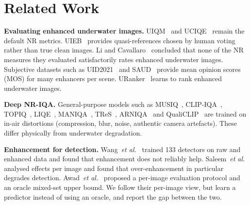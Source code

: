 \documentclass[conference]{IEEEtran}
\begin{document}
\section{Related Work}
\textbf{Evaluating enhanced underwater images.} UIQM~\cite{panetta2016uiqm} and UCIQE~\cite{yang2015uciqe} remain the default NR metrics. UIEB~\cite{li2020uieb} provides quasi-references chosen by human voting rather than true clean images. Li and Cavallaro~\cite{li2022limits} concluded that none of the NR measures they evaluated satisfactorily rates enhanced underwater images. Subjective datasets such as UID2021~\cite{hou2023uid2021} and SAUD~\cite{jiang2022saud} provide mean opinion scores (MOS) for many enhancers per scene. URanker~\cite{guo2023uranker} learns to rank enhanced underwater images.

\textbf{Deep NR-IQA.} General-purpose models such as MUSIQ~\cite{ke2021musiq}, CLIP-IQA~\cite{wang2023clipiqa}, TOPIQ~\cite{chen2024topiq}, LIQE~\cite{zhang2023liqe}, MANIQA~\cite{yang2022maniqa}, TReS~\cite{golestaneh2022tres}, ARNIQA~\cite{agnolucci2024arniqa} and QualiCLIP~\cite{agnolucci2024qualiclip} are trained on in-air distortions (compression, blur, noise, authentic camera artefacts). These differ physically from underwater degradation.

\textbf{Enhancement for detection.} Wang~\textit{et al.}~\cite{wang2024isuie} trained 133 detectors on raw and enhanced data and found that enhancement does not reliably help. Saleem~\textit{et al.}~\cite{saleem2025influence} analysed effects per image and found that over-enhancement in particular degrades detection. Awad~\textit{et al.}~\cite{awad2026revisiting} proposed a per-image evaluation protocol and an oracle mixed-set upper bound. We follow their per-image view, but learn a predictor instead of using an oracle, and report the gap between the two.

\end{document}
